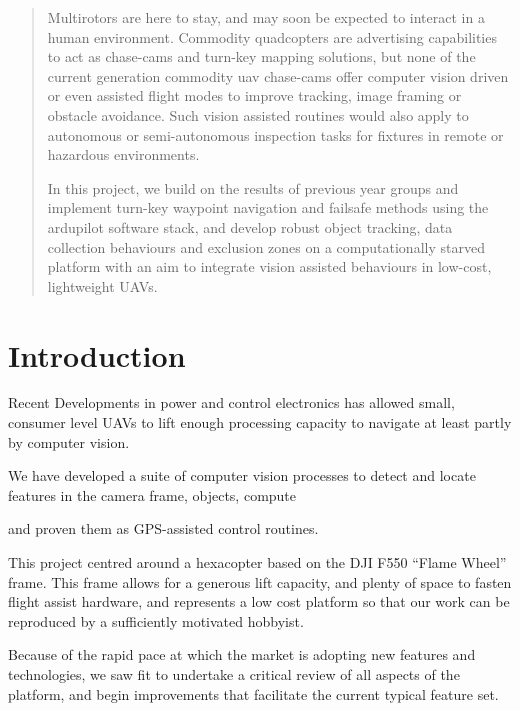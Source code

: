 \documentclass{article}
\begin{document}
  

  \begin{abstract}
  Multirotors are here to stay, and may soon be expected to interact in a human environment.
  Commodity quadcopters are advertising capabilities to act as  chase-cams and turn-key mapping solutions, but none of the current generation commodity uav chase-cams offer computer vision driven or even assisted flight modes to improve tracking, image framing or obstacle avoidance.  Such vision assisted routines would also apply to autonomous or semi-autonomous inspection tasks for fixtures in remote or hazardous environments.

  In this project, we build on the results of previous year groups and implement turn-key waypoint navigation and failsafe methods using the ardupilot software stack, and develop robust object tracking, data collection behaviours and exclusion zones on a computationally starved platform with an aim to integrate vision assisted behaviours in low-cost, lightweight UAVs.
  \end{abstract}

  \tableofcontents
  \pagebreak
  \section{Introduction}

    Recent Developments in power and control electronics has allowed small, consumer level UAVs to lift enough processing capacity to navigate at least partly by computer vision.

    We have developed a suite of computer vision processes to detect and locate features in the camera frame,  objects, compute 

    and proven them as GPS-assisted control routines.



    This project centred around a hexacopter based on the DJI F550 ``Flame Wheel'' frame. This frame allows for a generous lift capacity, and plenty of space to fasten flight assist hardware, and represents a low cost platform so that our work can be reproduced by a sufficiently motivated hobbyist.

    Because of the rapid pace at which the market is adopting new features and technologies, we saw fit to undertake a critical review of all aspects of the platform, and begin improvements that facilitate the current typical feature set.
\end{document}
